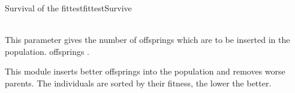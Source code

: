 

\begin{moduledoc}{Survival of the fittest}{fittestSurvive}
  
\item[\KeyWord{NoOfOffsprings} \Param{k}]~\\
This parameter gives the number of offsprings which are to be inserted
in the population. 
offsprings .

  
\end{moduledoc}

This module inserts better offsprings into
the population  and removes worse parents.
The individuals are sorted by their fitness, the lower the better.
